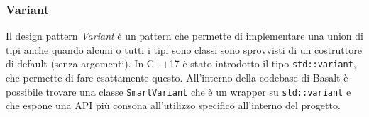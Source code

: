 \subsubsection{Variant}
Il design pattern \textit{Variant} è un pattern che permette di implementare una union di tipi anche 
quando alcuni o tutti i tipi sono classi sono sprovvisti di un costruttore di default (senza argomenti).
In C++17 è stato introdotto il tipo \texttt{std::variant}, che permette di fare esattamente questo. All'interno 
della codebase di Basalt è possibile trovare una classe \texttt{SmartVariant} che è un wrapper su \texttt{std::variant}
e che espone una API più consona all'utilizzo specifico all'interno del progetto. \\

